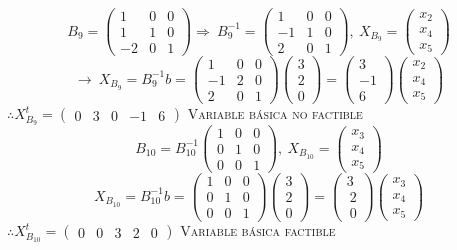 \begin{itemize}
    $$B_9=\begin{pmatrix}1&0&0\\ 1&1&0\\ -2&0&1\end{pmatrix}\Rightarrow \:B_9^{-1}=\begin{pmatrix}1&0&0\\ -1&1&0\\ 2&0&1\end{pmatrix},\:X_{B_9}=\begin{pmatrix}x_2\\ x_4\\ x_5\end{pmatrix}$$
    $$\rightarrow \:X_{B_9}=B_9^{-1}b=\begin{pmatrix}1&0&0\\ -1&2&0\\ 2&0&1\end{pmatrix}\begin{pmatrix}3\\ 2\\ 0\end{pmatrix}=\begin{pmatrix}3\\ -1\\ 6\end{pmatrix}\begin{pmatrix}x_2\\ x_4\\ x_5\end{pmatrix}$$
    $\therefore X_{B_9}^t=\begin{pmatrix}0&3&0&-1&6\end{pmatrix}$ \textsc{Variable  básica no factible}
    $$B_{10}=B_{10}^{-1}\begin{pmatrix}1&0&0\\ 0&1&0\\ 0&0&1\end{pmatrix},\:X_{B_{10}}=\begin{pmatrix}x_3\\ x_4\\ x_5\end{pmatrix}$$
    $$X_{B_{10}}=B_{10}^{-1}b=\begin{pmatrix}1&0&0\\ 0&1&0\\ 0&0&1\end{pmatrix}\begin{pmatrix}3\\ 2\\ 0\end{pmatrix}=\begin{pmatrix}3\\ \:2\\ \:0\end{pmatrix}\begin{pmatrix}x_3\\ x_4\\ x_5\end{pmatrix}$$
    $\therefore X_{B_{10}}^t=\begin{pmatrix}0&0&3&2&0\end{pmatrix}$  \textsc{Variable  básica factible}
    

\end{itemize}
